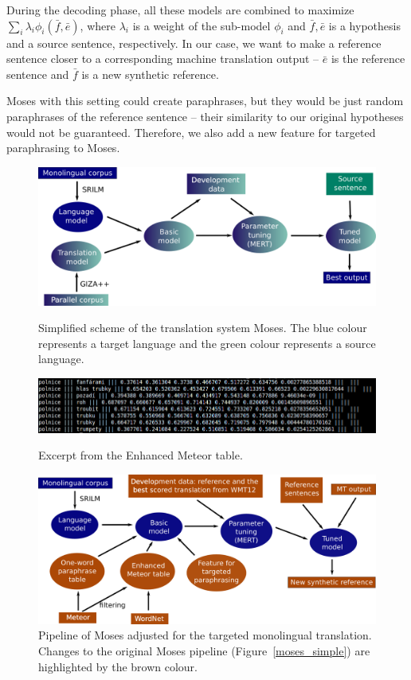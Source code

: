 \documentclass[11pt]{article}
\def\Fref#1{Figure~\ref{#1}}
\begin{document}
During the decoding phase, all these models are combined to maximize 
$ \sum_i \lambda_i \phi_i (\bar{f},\bar{e}) $, where  $ \lambda_i $ is a weight 
of the sub-model $ \phi_i $ and $ \bar{f},\bar{e} $ is a hypothesis and 
a source sentence, respectively. In our case, we want to make a reference 
sentence closer to a corresponding machine translation output -- $ \bar{e} $ is 
the reference sentence and $ \bar{f} $ is a new synthetic reference.

Moses with this setting could create paraphrases, but they would be just 
random paraphrases of the reference sentence -- their similarity to our 
original hypotheses would not be guaranteed. Therefore, we also add a new 
feature for targeted paraphrasing to Moses.


\begin{figure}
\begin{center}

\includegraphics[scale=0.3]{moses.png} 
\caption{Simplified scheme of the translation system Moses. The blue colour 
represents a target language and the green colour represents a source language.}
\label{moses_simple}

\vspace{30pt}

\includegraphics[scale=0.65]{moses_translation_tables.png} 
\caption{Excerpt from the Enhanced Meteor table.}
\label{moses_tables}

\vspace{30pt}
\includegraphics[scale=0.27]{moses_paraphrasing.png} 
\caption{Pipeline of Moses adjusted for the targeted monolingual translation.
Changes to the original Moses pipeline (\Fref{moses_simple}) are highlighted by
the brown colour.}
\label{moses_paraphrasing}
\end{center}
\end{figure}
\end{document}

